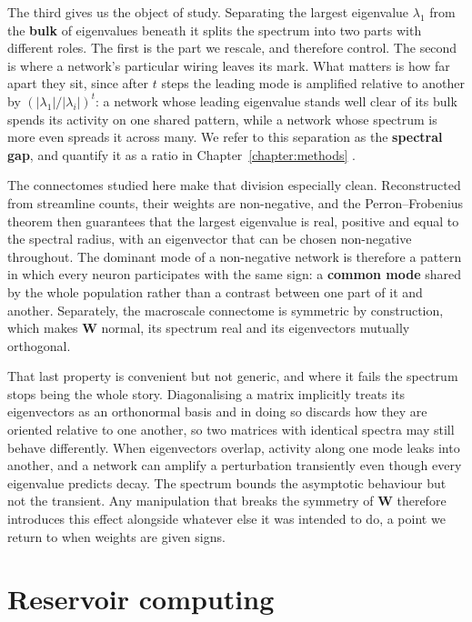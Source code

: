 The third gives us the object of study. Separating the largest eigenvalue $\lambda_1$ from the
\textbf{bulk} of eigenvalues beneath it splits the spectrum into two parts with different roles. The
first is the part we rescale, and therefore control. The second is where a network's particular
wiring leaves its mark. What matters is how far apart they sit, since after $t$ steps the leading
mode is amplified relative to another by $(|\lambda_1|/|\lambda_i|)^{t}$: a network whose leading
eigenvalue stands well clear of its bulk spends its activity on one shared pattern, while a network
whose spectrum is more even spreads it across many. We refer to this separation as the
\textbf{spectral gap}, and quantify it as a ratio in Chapter~\ref{chapter:methods}
\cite{schaub2015emergence}.

The connectomes studied here make that division especially clean. Reconstructed from streamline
counts, their weights are non-negative, and the Perron--Frobenius theorem then guarantees that the
largest eigenvalue is real, positive and equal to the spectral radius, with an eigenvector that can
be chosen non-negative throughout. The dominant mode of a non-negative network is therefore a pattern
in which every neuron participates with the same sign: a \textbf{common mode} shared by the whole
population rather than a contrast between one part of it and another. Separately, the macroscale
connectome is symmetric by construction, which makes $\mathbf{W}$ normal, its spectrum real and its
eigenvectors mutually orthogonal.

That last property is convenient but not generic, and where it fails the spectrum stops being the
whole story. Diagonalising a matrix implicitly treats its eigenvectors as an orthonormal basis and in
doing so discards how they are oriented relative to one another, so two matrices with identical
spectra may still behave differently. When eigenvectors overlap, activity along one mode leaks into
another, and a network can amplify a perturbation transiently even though every eigenvalue predicts
decay. The spectrum bounds the asymptotic behaviour but not the transient. Any manipulation that
breaks the symmetry of $\mathbf{W}$ therefore introduces this effect alongside whatever else it was
intended to do, a point we return to when weights are given signs.









\section{Reservoir computing}
\label{section:ch2_3}
\bigskip

